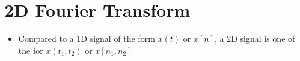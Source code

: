 \section{2D Fourier Transform}
\begin{itemize}
	\item Compared to a 1D signal of the form \( x(t) \) or \( x[n] \), 
		a 2D signal is one of the for \( x(t_1, t_2) \) or 
		\( x[n_1, n_2] \). 
\end{itemize}
